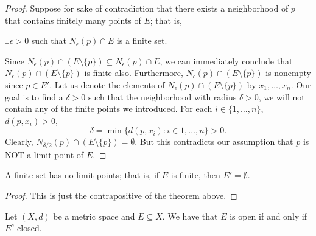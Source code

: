 \documentclass[a4paper]{report}
\begin{document}
\begin{proof}
Suppose for sake of contradiction that there exists a neighborhood of \( p  \) that contains finitely many points of \( E  \); that is,
\begin{center}
    \( \exists \epsilon > 0  \) such that \( {N}_{\epsilon}(p) \cap E  \) is a finite set.
\end{center}
Since \( {N}_{\epsilon}(p) \cap (E \setminus  \{ p \} ) \subseteq  {N}_{\epsilon}(p) \cap E  \), we can immediately conclude that \( {N}_{\epsilon}(p) \cap (E \setminus  \{ p \} ) \) is finite also. Furthermore, \( {N}_{\epsilon}(p) \cap (E \setminus  \{ p  \} ) \) is nonempty since \( p \in E' \). Let us denote the elements of \( {N}_{\epsilon}(p) \cap (E \setminus  \{ p \} )  \) by \( {x}_{1}, \dots, {x}_{n} \). Our goal is to find a \( \delta > 0  \) such that the neighborhood with radius \( \delta > 0  \), we will not contain any of the finite points we introduced. For each \( i \in \{ 1,\dots, n \}  \), \( d(p,{x}_{i}) > 0  \),
\[  \delta = \min \{ d(p,{x}_{i}) : i \in {1,\dots,n} \} > 0.   \]
Clearly, \( {N}_{\delta/2}(p) \cap (E \setminus  \{ p \} ) = \emptyset \). But this contradicts our assumption that \( p  \) is NOT a limit point of \( E  \).
\end{proof}

\begin{corollary}
    A finite set has no limit points; that is, if \( E  \) is finite, then \( E' = \emptyset \).
\end{corollary}

\begin{proof}
This is just the contrapositive of the theorem above.
\end{proof}

\begin{theorem}[ ]
  Let \( (X,d) \) be a metric space and \( E \subseteq X  \). We have that \( E  \) is open if and only if \( E^{c} \) closed.
\end{theorem}
\end{document}
